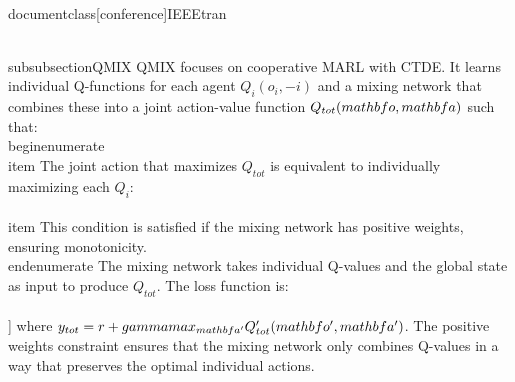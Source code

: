 \\documentclass[conference]{IEEEtran}
\begin{document}
\\subsubsection{QMIX}
QMIX focuses on cooperative MARL with CTDE. It learns individual Q-functions for each agent $Q_i(o_i, -i)$ and a mixing network that combines these into a joint action-value function $Q_{tot}(\\mathbf{o}, \\mathbf{a})$ such that:
\\begin{enumerate}
    \\item The joint action that maximizes $Q_{tot}$ is equivalent to individually maximizing each $Q_i$:
    \\[
    \\arg\\max_{\\mathbf{a}} Q_{tot}(\\mathbf{o}, \\mathbf{a}) = (\\arg\\max_{a_1} Q_1(o_1, a_1), \\dots, \\arg\\max_{a_N} Q_N(o_N, a_N))
    \\]
    \\item This condition is satisfied if the mixing network has positive weights, ensuring monotonicity.
\\end{enumerate}
The mixing network takes individual Q-values and the global state as input to produce $Q_{tot}$. The loss function is:
\\[
L(Q_{tot}) = \\mathbb{E}_{\\mathbf{o},\\mathbf{a},r,\\mathbf{o}' \\sim \\mathcal{D}} \\left[ \\left( Q_{tot}(\\mathbf{o},\\mathbf{a}) - y_{tot} \\right)^2 \\right]
\\]
where $y_{tot} = r + \\gamma \\max_{\\mathbf{a}'} Q'_{tot}(\\mathbf{o}', \\mathbf{a}')$. The positive weights constraint ensures that the mixing network only combines Q-values in a way that preserves the optimal individual actions.
\end{document}
